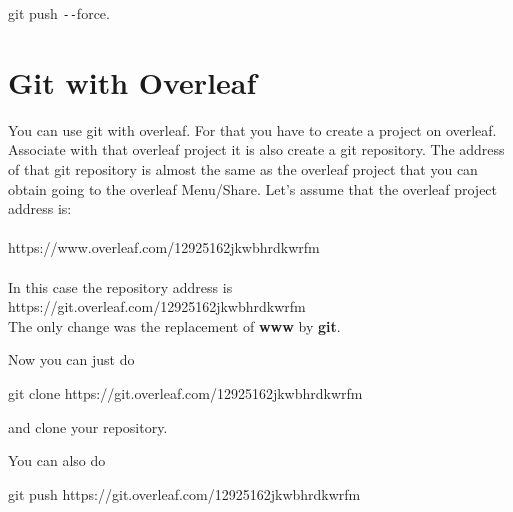 \begin{refsection}
git push \texttt{-{}-}force.

\section{Git with Overleaf}

You can use git with overleaf.
For that you have to create a project on overleaf.
Associate with that overleaf project it is also create a git repository.
The address of that git repository is almost the same as the overleaf project that you can obtain going to the overleaf Menu/Share. Let's assume that the overleaf project address is:\\
\\
\noindent https://www.overleaf.com/12925162jkwbhrdkwrfm\\
\\
In this case the repository address is https://git.overleaf.com/12925162jkwbhrdkwrfm\\
%
The only change was the replacement of \textbf{www} by \textbf{git}.

Now you can just do

git clone https://git.overleaf.com/12925162jkwbhrdkwrfm

and clone your repository.

You can also do

git push https://git.overleaf.com/12925162jkwbhrdkwrfm


\clearpage
\printbibliography[heading=bibliography]
\end{refsection}
\cleardoublepage

